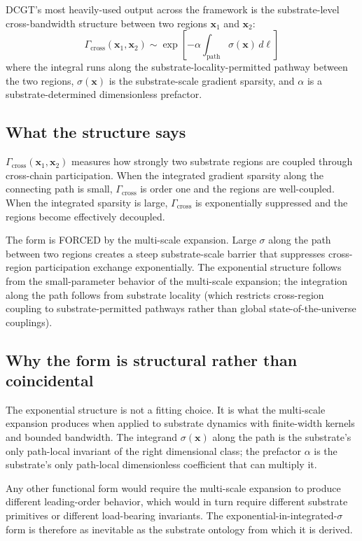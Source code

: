 \documentclass[11pt,a4paper]{article}
\begin{document}
DCGT's most heavily-used output across the framework is the substrate-level cross-bandwidth structure between two regions $\mathbf{x}_1$ and $\mathbf{x}_2$:
\[
\Gamma_{\mathrm{cross}}(\mathbf{x}_1, \mathbf{x}_2) \sim \exp\!\left[-\alpha \int_{\mathrm{path}} \sigma(\mathbf{x})\, d\ell\right]
\]
where the integral runs along the substrate-locality-permitted pathway between the two regions, $\sigma(\mathbf{x})$ is the substrate-scale gradient sparsity, and $\alpha$ is a substrate-determined dimensionless prefactor.

\subsection{What the structure says}

$\Gamma_{\mathrm{cross}}(\mathbf{x}_1, \mathbf{x}_2)$ measures how strongly two substrate regions are coupled through cross-chain participation. When the integrated gradient sparsity along the connecting path is small, $\Gamma_{\mathrm{cross}}$ is order one and the regions are well-coupled. When the integrated sparsity is large, $\Gamma_{\mathrm{cross}}$ is exponentially suppressed and the regions become effectively decoupled.

The form is FORCED by the multi-scale expansion. Large $\sigma$ along the path between two regions creates a steep substrate-scale barrier that suppresses cross-region participation exchange exponentially. The exponential structure follows from the small-parameter behavior of the multi-scale expansion; the integration along the path follows from substrate locality (which restricts cross-region coupling to substrate-permitted pathways rather than global state-of-the-universe couplings).

\subsection{Why the form is structural rather than coincidental}

The exponential structure is not a fitting choice. It is what the multi-scale expansion produces when applied to substrate dynamics with finite-width kernels and bounded bandwidth. The integrand $\sigma(\mathbf{x})$ along the path is the substrate's only path-local invariant of the right dimensional class; the prefactor $\alpha$ is the substrate's only path-local dimensionless coefficient that can multiply it.

Any other functional form would require the multi-scale expansion to produce different leading-order behavior, which would in turn require different substrate primitives or different load-bearing invariants. The exponential-in-integrated-$\sigma$ form is therefore as inevitable as the substrate ontology from which it is derived.
\end{document}
